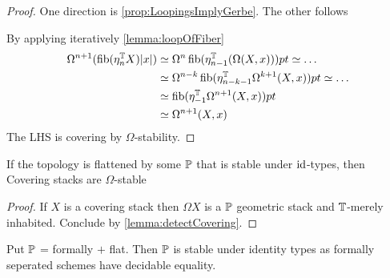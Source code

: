 \documentclass{article}
\begin{document}
\begin{proof}
	One direction is \ref{prop:LoopingsImplyGerbe}. The other follows
	
	By applying iteratively \ref{lemma:loopOfFiber} 
	\begin{align*}
		\Omega^{n+1} (\operatorname{fib} (\eta_n^{\mathbb{T}} X) |x|) &\simeq \Omega^n \operatorname{fib} (\eta_{n-1}^{\mathbb{T}} (\Omega (X,x))) pt \simeq \hdots \\
		&\simeq \Omega^{n-k} \operatorname{fib}(\eta_{n-k-1}^{\mathbb{T}} \Omega^{k+1}(X,x)) pt \simeq \hdots \\
		&\simeq \operatorname{fib} (\eta_{-1}^{\mathbb{T}} \Omega^{n+1} (X,x)) pt \\
		&\simeq \Omega^{n+1} (X , x)
	\end{align*}
	The LHS is covering by $\Omega$-stability.
\end{proof}



\begin{lemma}
	If the topology is flattened by some $\mathbb{P}$ that is stable under $\operatorname{id}$-types, then Covering stacks are $\Omega$-stable
\end{lemma}
\begin{proof}
	If $X$ is a covering stack then $\Omega X$ is a $\mathbb{P}$ geometric stack and $\mathbb{T}$-merely inhabited. Conclude by  \ref{lemma:detectCovering}.
\end{proof}
\begin{example}
	Put $\mathbb{P}$ = formally \etale $+$ flat. Then $\mathbb{P}$ is stable under identity types as formally \etale seperated schemes have decidable equality. 
\end{example}
\end{document}
